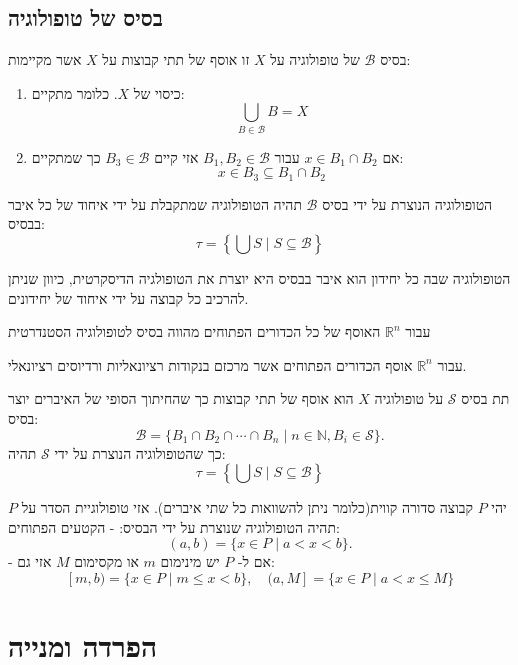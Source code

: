 \documentclass{tstextbook}
\begin{document}
\subsection{בסיס של טופולוגיה}

\begin{definition}
בסיס \(\mathcal{B}\) של טופולוגיה על \(X\) זו אוסף של תתי קבוצות על \(X\) אשר מקיימות:

  \begin{enumerate}
    \item כיסוי של \(X\). כלומר מתקיים: 
$$\bigcup_{B\in{\mathcal{B}}}B=X$$


    \item אם \(x \in B_{1}\cap B_{2}\) עבור \(B_{1},B_{2}\in \mathcal{B}\) אזי קיים \(B_{3} \in \mathcal{B}\) כך שמתקיים: 
$$x\in B_{3}\subseteq B_{1}\cap B_{2}$$


  \end{enumerate}
\end{definition}
\begin{definition}
הטופולוגיה הנוצרת על ידי בסיס \(\mathcal{B}\) תהיה הטופולוגיה שמתקבלת על ידי איחוד של כל איבר בבסיס:
$$\tau=\left\{\bigcup S\mid S\subseteq\mathcal{B}\right\}$$

\end{definition}
\begin{example}
הטופולוגיה שבה כל יחידון הוא איבר בבסיס היא יוצרת את הטופולגיה הדיסקרטית, כיוון שניתן להרכיב כל קבוצה על ידי איחוד של יחידונים.

\end{example}
\begin{example}
עבור \(\mathbb{R}^{n}\) האוסף של כל הכדורים הפתוחים מהווה בסיס לטופולוגיה הסטנדרטית

\end{example}
\begin{example}
עבור \(\mathbb{R}^{n}\) אוסף הכדורים הפתוחים אשר מרכזם בנקודות רציונאליות ורדיוסים רציונאלי.

\end{example}
\begin{definition}[תת בסיס]
תת בסיס \(\mathcal{S}\) על טופולוגיה \(X\) הוא אוסף של תתי קבוצות כך שהחיתוך הסופי של האיברים יוצר בסיס:
$${\mathcal{B}}=\{B_{1}\cap B_{2}\cap\cdots\cap B_{n}\mid n\in\mathbb{N},B_{i}\in{\mathcal{S}}\}.$$
כך שהטופולוגיה הנוצרת על ידי \(\mathcal{S}\) תהיה:
$$\tau=\left\{\bigcup S\mid S\subseteq\mathcal{B}\right\}$$

\end{definition}
\begin{definition}
יהי \(P\) קבוצה סדורה קווית(כלומר ניתן להשוואות כל שתי איברים). אזי טופולוגיית הסדר על \(P\) תהיה הטופולוגיה שנוצרת על ידי הבסיס:
- הקטעים הפתוחים:
$$(a,b)=\{x\in P\mid a<x<b\}.$$
- אם ל- \(P\) יש מינימום \(m\) או מקסימום \(M\) אזי גם:
$$[m,b)=\{x\in P\mid m\leq x<b\},\quad(a,M]=\{x\in P\mid a<x\leq M\}$$

\end{definition}
\section{הפרדה ומנייה}
\end{document}

